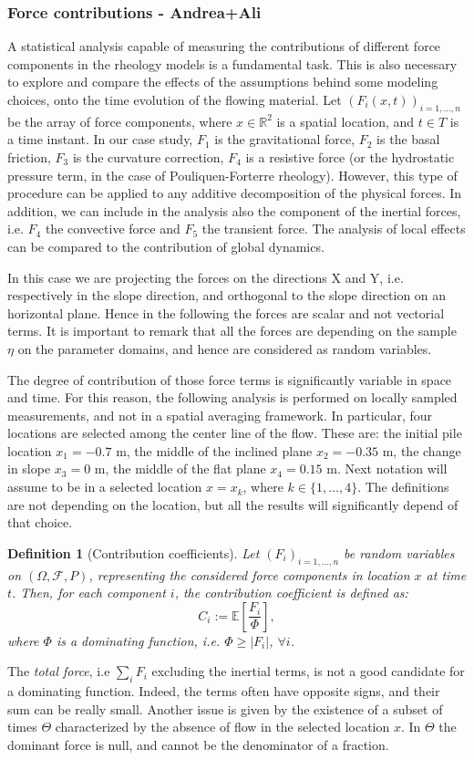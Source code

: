 \documentclass{article}
\newtheorem{definition}[theorem]{Definition}
\begin{document}
\subsubsection{Force contributions - Andrea+Ali}
A statistical analysis capable of measuring the contributions of different force components in the rheology models is a fundamental task. This is also necessary to explore and compare the effects of the assumptions behind some modeling choices, onto the time evolution of the flowing material. Let $(F_i(x,t))_{i=1,\dots, n}$ be the array of force components, where $x\in\mathbb R^2$ is a spatial location, and $t\in T$ is a time instant. In our case study, $F_1$ is the gravitational force, $F_2$ is the basal friction, $F_3$ is the curvature correction, $F_4$ is a resistive force (or the hydrostatic pressure term, in the case of Pouliquen-Forterre rheology). However, this type of procedure can be applied to any additive decomposition of the physical forces. In addition, we can include in the analysis also the component of the inertial forces, i.e. $F_4$ the convective force and $F_5$ the transient force. The analysis of local effects can be compared to the contribution of global dynamics.

In this case we are projecting the forces on the directions X and Y, i.e. respectively in the slope direction, and orthogonal to the slope direction on an horizontal plane. Hence in the following the forces are scalar and not vectorial terms. It is important to remark that all the forces are depending on the sample $\eta$ on the parameter domains, and hence are considered as random variables.

The degree of contribution of those force terms is significantly variable in space and time. For this reason, the following analysis is performed on locally sampled measurements, and not in a spatial averaging framework. In particular, four locations are selected among the center line of the flow. These are: the initial pile location $x_1=-0.7$ m, the middle of the inclined plane $x_2=-0.35$ m, the change in slope $x_3=0$ m, the middle of the flat plane $x_4=0.15$ m. Next notation will assume to be in a selected location $x=x_k$, where $k\in\{1,\dots, 4\}$. The definitions are not depending on the location, but all the results will significantly depend of that choice.

\begin{definition}[Contribution coefficients]
Let $(F_i)_{i=1,\dots, n}$ be random variables on $(\Omega, \mathcal F, P)$, representing the considered force components in location $x$ at time $t$. Then, for each component $i$, the contribution coefficient is defined as:
$$C_i:=\mathbb E\left[\frac{F_i}{\Phi}\right],$$
where $\Phi$ is a dominating function, i.e. $\Phi\ge |F_i|$, $\forall i$.
\end{definition}
The \emph{total force}, i.e $\sum_i F_i$ excluding the inertial terms, is not a good candidate for a dominating function. Indeed, the terms often have opposite signs, and their sum can be really small. Another issue is given by the existence of a subset of times $\Theta$ characterized by the absence of flow in the selected location $x$. In $\Theta$ the dominant force is null, and cannot be the denominator of a fraction.
\end{document}
